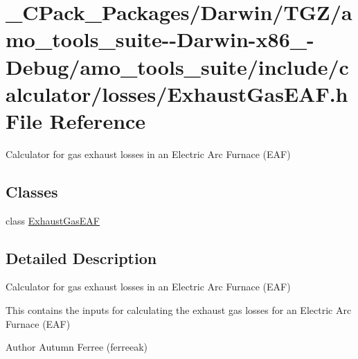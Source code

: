 \hypertarget{___c_pack___packages_2_darwin_2_t_g_z_2amo__tools__suite--_darwin-x86__64-_debug_2amo__tools__suf6922c1509edb9b9e78e87e2f63bd39f}{}\section{\+\_\+\+C\+Pack\+\_\+\+Packages/\+Darwin/\+T\+G\+Z/amo\+\_\+tools\+\_\+suite-\/-\/\+Darwin-\/x86\+\_-\/\+Debug/amo\+\_\+tools\+\_\+suite/include/calculator/losses/\+Exhaust\+Gas\+E\+AF.h File Reference}
\label{___c_pack___packages_2_darwin_2_t_g_z_2amo__tools__suite--_darwin-x86__64-_debug_2amo__tools__suf6922c1509edb9b9e78e87e2f63bd39f}


Calculator for gas exhaust losses in an Electric Arc Furnace (E\+AF)  


\subsection*{Classes}
\begin{DoxyCompactItemize}
\item 
class \hyperlink{class_exhaust_gas_e_a_f}{Exhaust\+Gas\+E\+AF}
\end{DoxyCompactItemize}


\subsection{Detailed Description}
Calculator for gas exhaust losses in an Electric Arc Furnace (E\+AF) 

This contains the inputs for calculating the exhaust gas losses for an Electric Arc Furnace (E\+AF)

\begin{DoxyAuthor}{Author}
Autumn Ferree (ferreeak) 
\end{DoxyAuthor}
